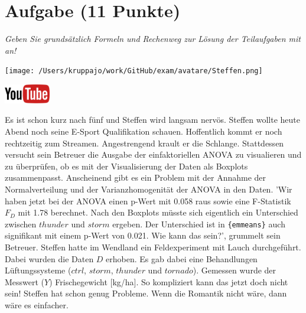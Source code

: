 \documentclass[a4paper, 9pt]{scrartcl}\usepackage[]{graphicx}\usepackage[]{xcolor}
\begin{document}
 
\clearpage

\section{Aufgabe \hfill (11 Punkte)}

\textit{Geben Sie grundsätzlich Formeln und Rechenweg zur Lösung der Teilaufgaben mit an!} \\[1Ex]
 

 
\begin{minipage}[t]{0.5\textwidth}
\texttt{[image: /Users/kruppajo/work/GitHub/exam/avatare/Steffen.png]}
\end{minipage}
\begin{minipage}[t]{0.5\textwidth}
\hfill
\href{https://youtu.be/M9Uhm67ndxM}{\includegraphics[width = 2cm]{img/youtube}}\\[1Ex]
\end{minipage}
\vspace{1ex}



Es ist schon kurz nach fünf und Steffen wird langsam nervös. Steffen wollte heute Abend noch seine E-Sport Qualifikation schauen. Hoffentlich kommt er noch rechtzeitig zum Streamen. Angestrengend krault er die Schlange. Stattdessen versucht sein Betreuer die Ausgabe der einfaktoriellen ANOVA zu visualieren und zu überprüfen, ob es mit der Visualisierung der Daten als Boxplots zusammenpasst. Anscheinend gibt es ein Problem mit der Annahme der Normalverteilung und der Varianzhomogenität der ANOVA in den Daten. 'Wir haben jetzt bei der ANOVA einen p-Wert mit 0.058 raus sowie eine F-Statistik $F_D$ mit 1.78 berechnet. Nach den Boxplots müsste sich eigentlich ein Unterschied zwischen $thunder$ und $storm$ ergeben. Der Unterschied ist in \texttt{\{emmeans\}} auch signifikant mit einem p-Wert von 0.021. Wie kann das sein?', grummelt sein Betreuer. Steffen hatte im Wendland ein Feldexperiment mit Lauch durchgeführt. Dabei wurden die Daten $D$ erhoben. Es gab dabei eine Behandlungen Lüftungssysteme ($ctrl$, $storm$, $thunder$ und $tornado$). Gemessen wurde der Messwert ($Y$) Frischegewicht [kg/ha]. So kompliziert kann das jetzt doch nicht sein! Steffen hat schon genug Probleme. Wenn die Romantik nicht wäre, dann wäre es einfacher.
\end{document}
